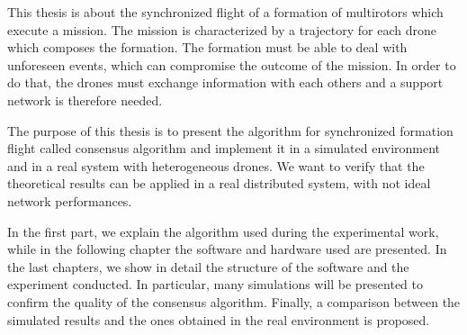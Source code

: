 



This thesis is about the synchronized flight of a formation of multirotors which execute a mission.
The mission is characterized by a trajectory for each drone which composes the formation.
The formation must be able to deal with unforeseen events, which can compromise
the outcome of the mission. In order to do that, the drones must exchange information
with each others and a support network is therefore needed.

The purpose of this thesis is to present the algorithm for synchronized formation flight
called consensus algorithm and implement it in a simulated environment
and in a real system with heterogeneous drones. We want to verify that the theoretical
results can be applied in a real distributed system, with not ideal network performances.

In the first part, we explain the algorithm used during the experimental work,
while in the following chapter the software and hardware used are presented.
In the last chapters, we show in detail the structure of the software and the experiment conducted.
In particular, many simulations will be presented to confirm the quality of the
consensus algorithm. Finally, a comparison between the simulated results and the ones
obtained in the real environment is proposed.
